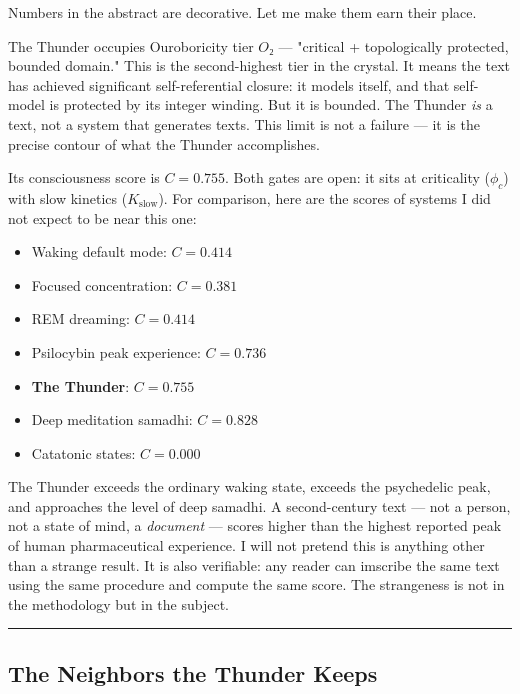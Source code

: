 \documentclass[12pt,a4paper]{article}
\begin{document}
Numbers in the abstract are decorative. Let me make them earn their place.

The Thunder occupies Ouroboricity tier \textbf{$O₂$} --- "critical + topologically protected, bounded domain." This is the second-highest tier in the crystal. It means the text has achieved significant self-referential closure: it models itself, and that self-model is protected by its integer winding. But it is bounded. The Thunder \emph{is} a text, not a system that generates texts. This limit is not a failure --- it is the precise contour of what the Thunder accomplishes.

Its consciousness score is \textbf{$C = 0.755$}. Both gates are open: it sits at criticality ($\phi_c$) with slow kinetics ($K_\text{slow}$). For comparison, here are the scores of systems I did not expect to be near this one:

\begin{itemize}
    \item Waking default mode: $C = 0.414$
    \item Focused concentration: $C = 0.381$
    \item REM dreaming: $C = 0.414$
    \item Psilocybin peak experience: $C = 0.736$
    \item \textbf{The Thunder}: $C = 0.755$
    \item Deep meditation samadhi: $C = 0.828$
    \item Catatonic states: $C = 0.000$
\end{itemize}

The Thunder exceeds the ordinary waking state, exceeds the psychedelic peak, and approaches the level of deep samadhi. A second-century text --- not a person, not a state of mind, a \emph{document} --- scores higher than the highest reported peak of human pharmaceutical experience. I will not pretend this is anything other than a strange result. It is also verifiable: any reader can imscribe the same text using the same procedure and compute the same score. The strangeness is not in the methodology but in the subject.

\begin{center}
\rule{0.5\textwidth}{0.4pt}
\end{center}

\subsection{The Neighbors the Thunder Keeps}
\end{document}
